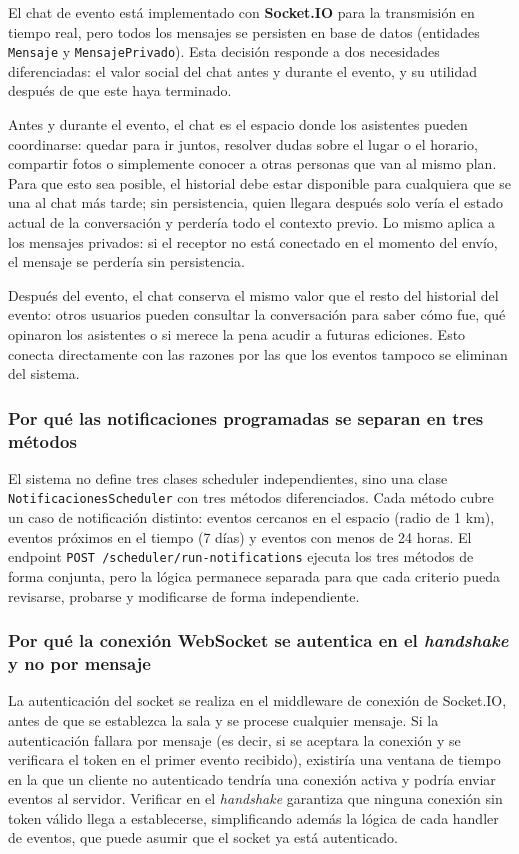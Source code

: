 El chat de evento está implementado con \textbf{Socket.IO} para la transmisión en tiempo real, pero todos los mensajes se persisten en base de datos (entidades \texttt{Mensaje} y \texttt{MensajePrivado}). Esta decisión responde a dos necesidades diferenciadas: el valor social del chat antes y durante el evento, y su utilidad después de que este haya terminado.

Antes y durante el evento, el chat es el espacio donde los asistentes pueden coordinarse: quedar para ir juntos, resolver dudas sobre el lugar o el horario, compartir fotos o simplemente conocer a otras personas que van al mismo plan. Para que esto sea posible, el historial debe estar disponible para cualquiera que se una al chat más tarde; sin persistencia, quien llegara después solo vería el estado actual de la conversación y perdería todo el contexto previo. Lo mismo aplica a los mensajes privados: si el receptor no está conectado en el momento del envío, el mensaje se perdería sin persistencia.

Después del evento, el chat conserva el mismo valor que el resto del historial del evento: otros usuarios pueden consultar la conversación para saber cómo fue, qué opinaron los asistentes o si merece la pena acudir a futuras ediciones. Esto conecta directamente con las razones por las que los eventos tampoco se eliminan del sistema.

\subsubsection{Por qué las notificaciones programadas se separan en tres métodos}

El sistema no define tres clases scheduler independientes, sino una clase \texttt{NotificacionesScheduler} con tres métodos diferenciados. Cada método cubre un caso de notificación distinto: eventos cercanos en el espacio (radio de 1 km), eventos próximos en el tiempo (7 días) y eventos con menos de 24 horas. El endpoint \texttt{POST /scheduler/run-notifications} ejecuta los tres métodos de forma conjunta, pero la lógica permanece separada para que cada criterio pueda revisarse, probarse y modificarse de forma independiente.

\subsubsection{Por qué la conexión WebSocket se autentica en el \textit{handshake} y no por mensaje}

La autenticación del socket se realiza en el middleware de conexión de Socket.IO, antes de que se establezca la sala y se procese cualquier mensaje. Si la autenticación fallara por mensaje (es decir, si se aceptara la conexión y se verificara el token en el primer evento recibido), existiría una ventana de tiempo en la que un cliente no autenticado tendría una conexión activa y podría enviar eventos al servidor. Verificar en el \textit{handshake} garantiza que ninguna conexión sin token válido llega a establecerse, simplificando además la lógica de cada handler de eventos, que puede asumir que el socket ya está autenticado.

